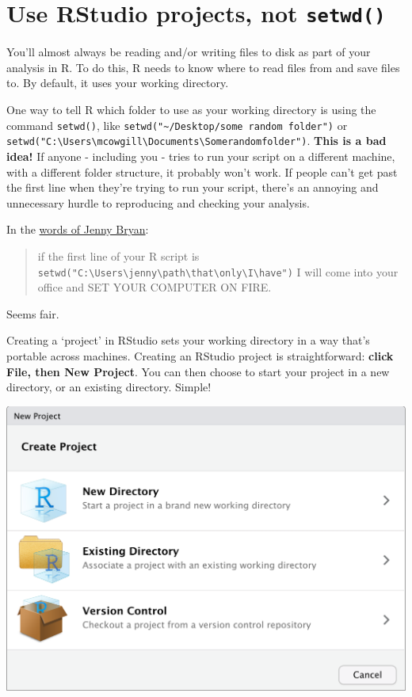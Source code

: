 \documentclass[]{book}
\begin{document}
\hypertarget{use-rstudio-projects-not-setwd}{%
\section{\texorpdfstring{Use RStudio projects, not \texttt{setwd()}}{Use RStudio projects, not setwd()}}\label{use-rstudio-projects-not-setwd}}

You'll almost always be reading and/or writing files to disk as part of your analysis in R. To do this, R needs to know where to read files from and save files to. By default, it uses your working directory.

One way to tell R which folder to use as your working directory is using the command \texttt{setwd()}, like \texttt{setwd("\textasciitilde{}/Desktop/some\ random\ folder")} or \texttt{setwd("C:\textbackslash{}Users\textbackslash{}mcowgill\textbackslash{}Documents\textbackslash{}Somerandomfolder")}. \textbf{This is a bad idea!} If anyone - including you - tries to run your script on a different machine, with a different folder structure, it probably won't work. If people can't get past the first line when they're trying to run your script, there's an annoying and unnecessary hurdle to reproducing and checking your analysis.

In the \href{https://www.tidyverse.org/articles/2017/12/workflow-vs-script/}{words of Jenny Bryan}:

\begin{quote}
if the first line of your R script is \texttt{setwd("C:\textbackslash{}Users\textbackslash{}jenny\textbackslash{}path\textbackslash{}that\textbackslash{}only\textbackslash{}I\textbackslash{}have")} I will come into your office and SET YOUR COMPUTER ON FIRE.
\end{quote}

Seems fair.

Creating a `project' in RStudio sets your working directory in a way that's portable across machines. Creating an RStudio project is straightforward: \textbf{click File, then New Project}. You can then choose to start your project in a new directory, or an existing directory. Simple!

\begin{center}\includegraphics[width=0.66\linewidth]{atlas/rstudio_newproject} \end{center}
\end{document}
